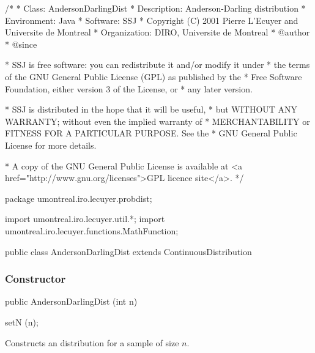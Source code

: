 \begin{code}
\begin{hide}
/*
 * Class:        AndersonDarlingDist
 * Description:  Anderson-Darling distribution
 * Environment:  Java
 * Software:     SSJ
 * Copyright (C) 2001  Pierre L'Ecuyer and Universite de Montreal
 * Organization: DIRO, Universite de Montreal
 * @author
 * @since

 * SSJ is free software: you can redistribute it and/or modify it under
 * the terms of the GNU General Public License (GPL) as published by the
 * Free Software Foundation, either version 3 of the License, or
 * any later version.

 * SSJ is distributed in the hope that it will be useful,
 * but WITHOUT ANY WARRANTY; without even the implied warranty of
 * MERCHANTABILITY or FITNESS FOR A PARTICULAR PURPOSE.  See the
 * GNU General Public License for more details.

 * A copy of the GNU General Public License is available at
   <a href="http://www.gnu.org/licenses">GPL licence site</a>.
 */
\end{hide}
package umontreal.iro.lecuyer.probdist;
\begin{hide}
import umontreal.iro.lecuyer.util.*;
import umontreal.iro.lecuyer.functions.MathFunction;
\end{hide}

public class AndersonDarlingDist extends ContinuousDistribution\begin{hide} {
   protected int n;

   private static class Function implements MathFunction {
      protected int n;
      protected double u;

      public Function (int n, double u) {
         this.n = n;
         this.u = u;
      }

      public double evaluate (double x) {
         return u - cdf(n,x);
      }
   }
\end{hide}
\end{code}
\subsubsection* {Constructor}

\begin{code}

   public AndersonDarlingDist (int n)\begin{hide} {
      setN (n);
   }\end{hide}
\end{code}
\begin{tabb}
   Constructs an \ad{} distribution for a sample of size $n$.
\end{tabb}

